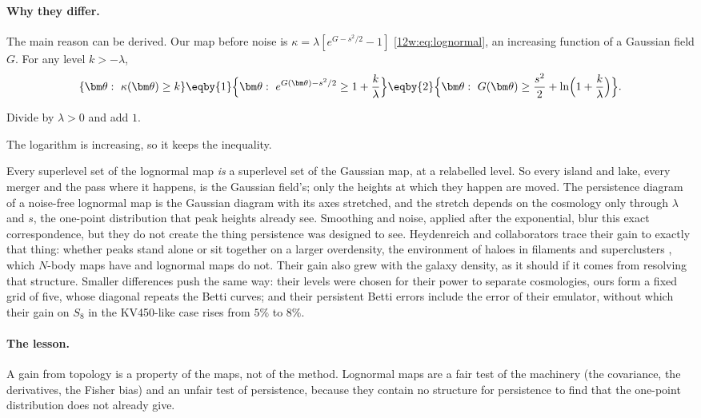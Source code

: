\paragraph{Why they differ.} The main reason can be derived. Our map before noise is $\kappa=\lambda[e^{G-s^2/2}-1]$
\eqref{12w:eq:lognormal}, an increasing function of a Gaussian field $G$. For any level $k>-\lambda$,
\begin{equation}
\{\bm\theta:\ \kappa(\bm\theta)\ge k\}
\eqby{1}\Bigl\{\bm\theta:\ e^{G(\bm\theta)-s^2/2}\ge1+\frac k\lambda\Bigr\}
\eqby{2}\Bigl\{\bm\theta:\ G(\bm\theta)\ge\frac{s^2}2+\ln\Bigl(1+\frac k\lambda\Bigr)\Bigr\}.
\label{12w:eq:ln-monotone}
\end{equation}
\begin{explain}
  \item Divide by $\lambda>0$ and add $1$.
  \item The logarithm is increasing, so it keeps the inequality.
\end{explain}
Every superlevel set of the lognormal map \emph{is} a superlevel set of the Gaussian map, at a relabelled level. So
every island and lake, every merger and the pass where it happens, is the Gaussian field's; only the heights at which
they happen are moved. The persistence diagram of a noise-free lognormal map is the Gaussian diagram with its axes
stretched, and the stretch depends on the cosmology only through $\lambda$ and $s$, the one-point distribution that
peak heights already see. Smoothing and noise, applied after the exponential, blur this exact correspondence, but they
do not create the thing persistence was designed to see. Heydenreich and collaborators trace their gain to exactly that
thing: whether peaks stand alone or sit together on a larger overdensity, the environment of haloes in filaments and
superclusters \cite[§4]{Heydenreich2021}, which $N$-body maps have and lognormal maps do not. Their gain also grew
with the galaxy density, as it should if it comes from resolving that structure. Smaller differences push the same
way: their levels were chosen for their power to separate cosmologies, ours form a fixed grid of five, whose diagonal
repeats the Betti curves; and their persistent Betti errors include the error of their emulator, without which their gain on $S_8$ in the
KV450-like case rises from $5\%$ to $8\%$.

\paragraph{The lesson.} A gain from topology is a property of the maps, not of the method. Lognormal maps are a fair
test of the machinery (the covariance, the derivatives, the Fisher bias) and an unfair test of persistence, because
they contain no structure for persistence to find that the one-point distribution does not already give.

